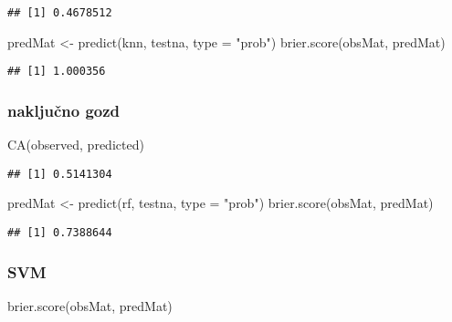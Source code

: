 \documentclass[
]{article}
\newenvironment{Shaded}{\begin{snugshade}}{\end{snugshade}}
\newcommand{\AttributeTok}[1]{\textcolor[rgb]{0.77,0.63,0.00}{#1}}
\newcommand{\FunctionTok}[1]{\textcolor[rgb]{0.00,0.00,0.00}{#1}}
\newcommand{\NormalTok}[1]{#1}
\newcommand{\OtherTok}[1]{\textcolor[rgb]{0.56,0.35,0.01}{#1}}
\newcommand{\StringTok}[1]{\textcolor[rgb]{0.31,0.60,0.02}{#1}}
\begin{document}
\begin{verbatim}
## [1] 0.4678512
\end{verbatim}

\begin{Shaded}
\begin{Highlighting}[]
\NormalTok{predMat }\OtherTok{\textless{}{-}} \FunctionTok{predict}\NormalTok{(knn, testna, }\AttributeTok{type =} \StringTok{"prob"}\NormalTok{)}
\FunctionTok{brier.score}\NormalTok{(obsMat, predMat)}
\end{Highlighting}
\end{Shaded}

\begin{verbatim}
## [1] 1.000356
\end{verbatim}

\hypertarget{nakljuux10dno-gozd}{%
\subsubsection{naključno gozd}\label{nakljuux10dno-gozd}}

\begin{Shaded}
\begin{Highlighting}[]
\FunctionTok{CA}\NormalTok{(observed, predicted)}
\end{Highlighting}
\end{Shaded}

\begin{verbatim}
## [1] 0.5141304
\end{verbatim}

\begin{Shaded}
\begin{Highlighting}[]
\NormalTok{predMat }\OtherTok{\textless{}{-}} \FunctionTok{predict}\NormalTok{(rf, testna, }\AttributeTok{type =} \StringTok{"prob"}\NormalTok{)}
\FunctionTok{brier.score}\NormalTok{(obsMat, predMat)}
\end{Highlighting}
\end{Shaded}

\begin{verbatim}
## [1] 0.7388644
\end{verbatim}

\hypertarget{svm}{%
\subsubsection{SVM}\label{svm}}

\begin{Shaded}
\begin{Highlighting}[]
\FunctionTok{brier.score}\NormalTok{(obsMat, predMat)}
\end{Highlighting}
\end{Shaded}
\end{document}
